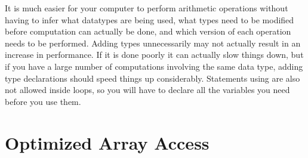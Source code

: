 It is much easier for your computer to perform arithmetic operations without having to infer what datatypes are being used, what types need to be modified before computation can actually be done, and which version of each operation needs to be performed.
Adding types unnecessarily may not actually result in an increase in performance. If it is done poorly it can actually slow things down, but if you have a large number of computations involving the same data type, adding type declarations should speed things up considerably.
Statements using  are also not allowed inside loops, so you will have to declare all the variables you need before you use them.

\section*{Optimized Array Access}

